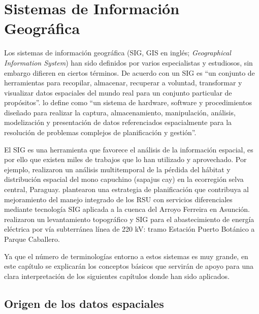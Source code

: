 \chapter{Sistemas de Información Geográfica}
\label{chap3}
\ifpdf
    \graphicspath{{Chapter3/Chapter3Figs/PNG/}{Chapter3/Chapter3Figs/PDF/}{Chapter3/Chapter3Figs/}}
\else
    \graphicspath{{Chapter3/Chapter3Figs/EPS/}{Chapter3/Chapter3Figs/}}
\fi


Los sistemas de información geográfica (SIG, GIS en inglés; \textit{Geographical Information System}) han sido definidos por varios especialistas y estudiosos, sin embargo difieren en ciertos términos. De acuerdo con \citet{Burrough1986PrinciplesAssessment} un SIG es “un conjunto de herramientas para recopilar, almacenar, recuperar a voluntad, transformar y visualizar datos espaciales del mundo real para un conjunto particular de propósitos”. \citet{NCGIA1990IntroductionGIS} lo define como “un sistema de hardware, software y procedimientos diseñado para realizar la captura, almacenamiento, manipulación, análisis, modelización y presentación de datos referenciados espacialmente para la resolución de problemas complejos de planificación y gestión”.

El SIG es una herramienta que favorece el análisis de la información espacial, es por ello que existen miles de trabajos que lo han utilizado y aprovechado. Por ejemplo, \citet{OsorioDominguez2018AnalisisParaguay} realizaron un análisis multitemporal de la pérdida del hábitat y distribución espacial del mono capuchino (sapajus cay) en la ecorregión selva central, Paraguay. \citet{Cabral2018EstrategiasAsuncion} plantearon una estrategia de planificación que contribuya al mejoramiento del manejo integrado de los RSU con servicios diferenciales mediante tecnología SIG aplicada a la cuenca del Arroyo Ferreira en Asunción. \citet{Acosta2006LevantamientoCaballero} realizaron un levantamiento topográfico y SIG para el abastecimiento de energía eléctrica por vía subterránea línea de 220 kV: tramo Estación Puerto Botánico a Parque Caballero.

Ya que el número de terminologías entorno a estos sistemas es muy grande, en este capítulo se explicarán los conceptos básicos que servirán de apoyo para una clara interpretación de los siguientes capítulos donde han sido aplicados.

\section{Origen de los datos espaciales}

